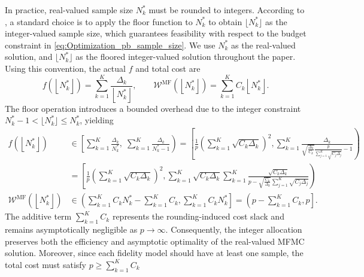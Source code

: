 In practice, real-valued sample size $N_k^*$ must be rounded to integers. According to \cite{PeWiGu:2016}, a standard choice is to apply the floor function to $N_k^*$ to obtain $\lfloor N_k^*\rfloor$ as the integer-valued sample size, which guarantees feasibility with respect to the budget constraint in \eqref{eq:Optimization_pb_sample_size}. We use $N_k^*$ as the real-valued solution, and $\lfloor N_k^* \rfloor$ as the floored integer-valued solution throughout the paper. Using this convention, the actual $f$ and total cost are
\[
f\left(\left\lfloor N_k^* \right\rfloor\right) = \sum_{k=1}^K\frac{\Delta_{k}}{\left\lfloor N_k^* \right\rfloor}, \qquad \mathcal{W}^{\text{MF}}\left(\left\lfloor N_k^* \right\rfloor\right) = \sum_{k=1}^K C_k\left\lfloor N_k^* \right\rfloor.
\]
The floor operation introduces a bounded overhead due to the integer constraint 
$N_k^*-1 < \lfloor N_k^*\rfloor \le N_k^*$, yielding
%
\begin{align*}
    f\left(\left\lfloor N_k^* \right\rfloor\right)&\in \left[\sum_{k=1}^K\frac{\Delta_{k}}{N_k^*},\; \sum_{k=1}^K\frac{\Delta_{k}}{N_k^*-1}\right) = \left[\frac{1}{p}\left(\sum_{k=1}^K \sqrt{C_k\Delta_k}\right)^2, \sum_{k=1}^K\frac{\Delta_{k}}{\sqrt{\frac{\Delta_k}{C_k}}\frac{p}{\sum_{j=1}^K \sqrt{C_j\Delta_j}}-1}\right)\\
    &=\left[\frac{1}{p}\left(\sum_{k=1}^K \sqrt{C_k\Delta_k}\right)^2, \sum_{k=1}^K \sqrt{C_k\Delta_k}\sum_{k=1}^K\frac{\sqrt{C_k\Delta_{k}}}{p-\sqrt{\frac{C_k}{\Delta_k}}\sum_{j=1}^K \sqrt{C_j\Delta_j}}\right)\\
    \mathcal{W}^{\text{MF}}\left(\left\lfloor N_k^* \right\rfloor\right) &\in \left(\sum_{k=1}^KC_kN_k^*-\sum_{k=1}^K C_k, \sum_{k=1}^KC_kN_k^*\right]=\left( p-\sum_{k=1}^K C_k,p\right].
\end{align*}
%
The additive term $\sum_{k=1}^K C_k$ represents the rounding-induced cost slack and remains asymptotically negligible as $p\to\infty$. Consequently, the integer allocation preserves both the efficiency and asymptotic optimality of the real-valued MFMC solution. Moreover, since each fidelity model should have at least one sample, the total cost must satisfy $p\ge \sum_{k=1}^K C_k$ 


